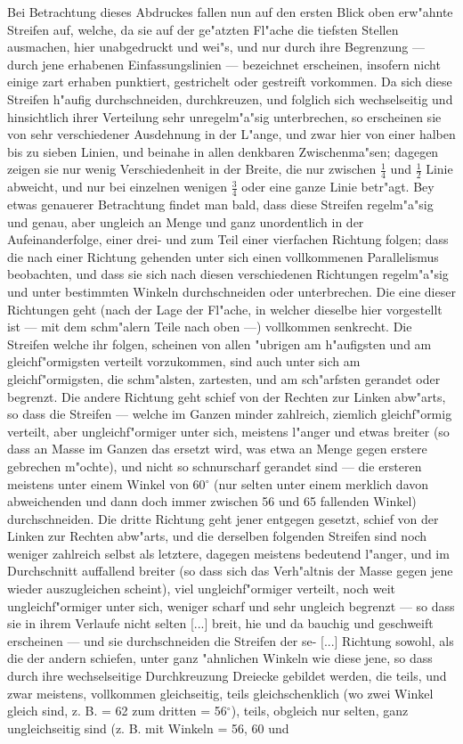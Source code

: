 \documentclass[a4paper, 11pt, oneside, german]{article}
\begin{document}
Bei Betrachtung dieses Abdruckes fallen nun auf den ersten Blick oben erw"ahnte Streifen auf, welche, da sie auf der ge"atzten Fl"ache die tiefsten Stellen ausmachen, hier unabgedruckt und wei"s, und nur durch ihre Begrenzung --- durch jene erhabenen Einfassungslinien --- bezeichnet erscheinen, insofern nicht einige zart erhaben punktiert, gestrichelt oder gestreift vorkommen. Da sich diese Streifen h"aufig durchschneiden, durchkreuzen, und folglich sich wechselseitig und hinsichtlich ihrer Verteilung sehr unregelm"a"sig unterbrechen, so erscheinen sie von sehr verschiedener Ausdehnung in der L"ange, und zwar hier von einer halben bis zu sieben Linien, und beinahe in allen denkbaren Zwischenma"sen; dagegen zeigen sie nur wenig Verschiedenheit in der Breite, die nur zwischen $\frac{1}{4}$ und $\frac{1}{2}$ Linie abweicht, und nur bei einzelnen wenigen $\frac{3}{4}$ oder eine ganze Linie betr"agt. Bey etwas genauerer Betrachtung findet man bald, dass diese Streifen regelm"a"sig und genau, aber ungleich an Menge und ganz unordentlich in der Aufeinanderfolge, einer drei- und zum Teil einer vierfachen Richtung folgen; dass die nach einer Richtung gehenden unter sich einen vollkommenen Parallelismus beobachten, und dass sie sich nach diesen verschiedenen Richtungen regelm"a"sig und unter bestimmten Winkeln durchschneiden oder unterbrechen. Die eine dieser Richtungen geht (nach der Lage der Fl"ache, in welcher dieselbe hier vorgestellt ist --- mit dem schm"alern Teile nach oben ---) vollkommen senkrecht. Die Streifen welche ihr folgen, scheinen von allen "ubrigen am h"aufigsten und am gleichf"ormigsten verteilt vorzukommen, sind auch unter sich am gleichf"ormigsten, die schm"alsten, zartesten, und am sch"arfsten gerandet oder begrenzt. Die andere Richtung geht schief von der Rechten zur Linken abw"arts, so dass die Streifen --- welche im Ganzen minder zahlreich, ziemlich gleichf"ormig verteilt, aber ungleichf"ormiger unter sich, meistens l"anger und etwas breiter (so dass an Masse im Ganzen das ersetzt wird, was etwa an Menge gegen erstere gebrechen m"ochte), und nicht so schnurscharf gerandet sind --- die ersteren meistens unter einem Winkel von 60$^{\circ}$ (nur selten unter einem merklich davon abweichenden und dann doch immer zwischen 56 und 65 fallenden Winkel) durchschneiden. Die dritte Richtung geht jener entgegen gesetzt, schief von der Linken zur Rechten abw"arts, und die derselben folgenden Streifen sind noch weniger zahlreich selbst als letztere, dagegen meistens bedeutend l"anger, und im Durchschnitt auffallend breiter (so dass sich das Verh"altnis der Masse gegen jene wieder auszugleichen scheint), viel ungleichf"ormiger verteilt, noch weit ungleichf"ormiger unter sich, weniger scharf und sehr ungleich begrenzt --- so dass sie in ihrem Verlaufe nicht selten [...] breit, hie und da bauchig und geschweift erscheinen --- und sie durchschneiden die Streifen der se- [...] Richtung sowohl, als die der andern schiefen, unter ganz "ahnlichen Winkeln wie diese jene, so dass durch ihre wechselseitige Durchkreuzung Dreiecke gebildet werden, die teils, und zwar meistens, vollkommen gleichseitig, teils gleichschenklich (wo zwei Winkel gleich sind, z. B. = 62 zum dritten = 56$^{\circ}$), teils, obgleich nur selten, ganz ungleichseitig sind (z. B. mit Winkeln = 56, 60 und 
\end{document}
